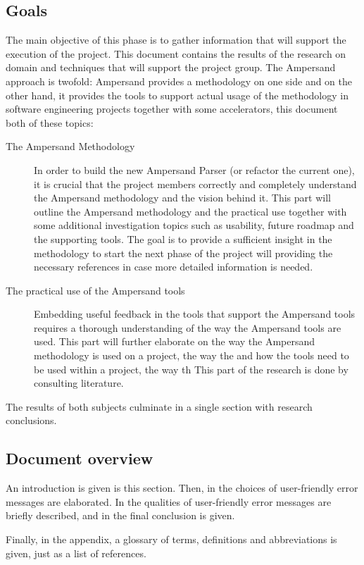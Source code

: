 \subsection{Goals}
The main objective of this phase is to gather information that will support the execution of the project.
This document contains the results of the research on domain and techniques that will support the project group.
The Ampersand approach is twofold: Ampersand provides a methodology on one side and on the other hand, it provides the tools to support actual usage of the methodology in software engineering projects together with some accelerators, this document both of these topics:
\begin{description}
	\item[The Ampersand Methodology]
	In order to build the new Ampersand Parser (or refactor the current one), it is crucial that the project members correctly and completely understand the Ampersand methodology and the vision behind it.
	This part will outline the Ampersand methodology and the practical use together with some additional investigation topics such as usability, future roadmap and the supporting tools.
	The goal is to provide a sufficient insight in the methodology to start the next phase of the project will providing the necessary references in case more detailed information is needed.
	
	\item[The practical use of the Ampersand tools]
	Embedding useful feedback in the tools that support the Ampersand tools requires a thorough understanding of the way the Ampersand tools are used.
	This part will further elaborate on the way the Ampersand methodology is used on a project, the way the  and how the tools need to be used within a project, the way th
	This part of the research is done by consulting literature.
\end{description}
%
The results of both subjects culminate in a single section with research conclusions.

\subsection{Document overview}
An introduction is given is this section.
Then, in the choices of user-friendly error messages are elaborated.
In  the qualities of user-friendly error messages are briefly described, and in the final conclusion is given.

Finally, in the appendix, a glossary of terms, definitions and abbreviations is given, just as a list of references.
